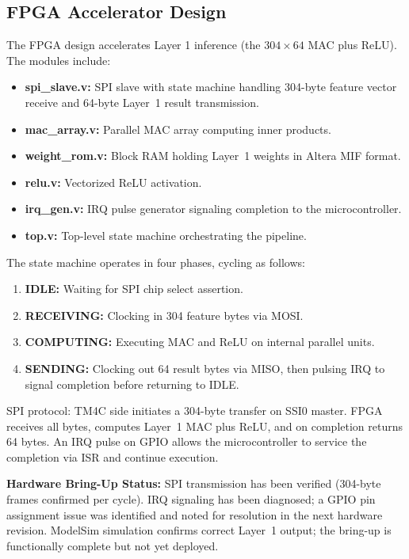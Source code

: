 \documentclass[conference]{IEEEtran}
\begin{document}
\subsection{FPGA Accelerator Design}

The FPGA design accelerates Layer 1 inference (the $304 \times 64$ MAC plus ReLU). The modules include:

\begin{itemize}
\item \textbf{spi\_slave.v:} SPI slave with state machine handling 304-byte feature vector receive and 64-byte Layer~1 result transmission.
\item \textbf{mac\_array.v:} Parallel MAC array computing inner products.
\item \textbf{weight\_rom.v:} Block RAM holding Layer~1 weights in Altera MIF format.
\item \textbf{relu.v:} Vectorized ReLU activation.
\item \textbf{irq\_gen.v:} IRQ pulse generator signaling completion to the microcontroller.
\item \textbf{top.v:} Top-level state machine orchestrating the pipeline.
\end{itemize}

The state machine operates in four phases, cycling as follows:
\begin{enumerate}
\item \textbf{IDLE:} Waiting for SPI chip select assertion.
\item \textbf{RECEIVING:} Clocking in 304 feature bytes via MOSI.
\item \textbf{COMPUTING:} Executing MAC and ReLU on internal parallel units.
\item \textbf{SENDING:} Clocking out 64 result bytes via MISO, then pulsing IRQ to signal completion before returning to IDLE.
\end{enumerate}

SPI protocol: TM4C side initiates a 304-byte transfer on SSI0 master. FPGA receives all bytes, computes Layer~1 MAC plus ReLU, and on completion returns 64 bytes. An IRQ pulse on GPIO allows the microcontroller to service the completion via ISR and continue execution.

\textbf{Hardware Bring-Up Status:} SPI transmission has been verified (304-byte frames confirmed per cycle). IRQ signaling has been diagnosed; a GPIO pin assignment issue was identified and noted for resolution in the next hardware revision. ModelSim simulation confirms correct Layer~1 output; the bring-up is functionally complete but not yet deployed.
\end{document}
